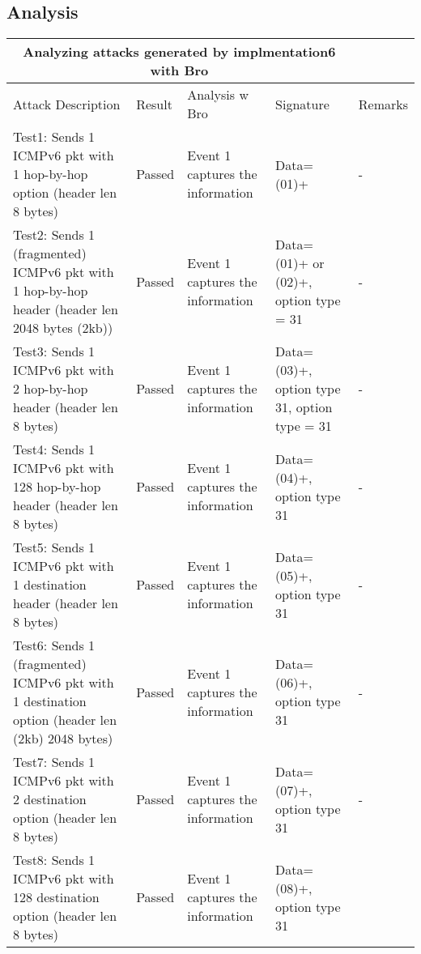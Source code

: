 \documentclass{article}
\begin{document}
\subsection{Analysis} 
\begin{longtable}{|p{1.5in}|p{0.5in}|p{1in}|p{0.8in}|p{1.2in}}
\hline
\multicolumn{4}{|c|}{Analyzing attacks generated by implmentation6 with Bro}\\ \hline
Attack Description&Result&Analysis w Bro&Signature&Remarks\\ \hline

Test1: Sends 1 ICMPv6 pkt with 1 hop-by-hop option (header len 8 bytes) &
Passed &
Event 1 captures the information &
Data=(01)+ &
-
\\ \hline
Test2: Sends 1  (fragmented) ICMPv6 pkt with 1 hop-by-hop header (header len 2048 bytes (2kb)) &
Passed &
Event 1 captures the information &
Data=(01)+ or (02)+, option type = 31 &
-
\\ \hline
Test3: Sends 1 ICMPv6 pkt with 2 hop-by-hop header (header len 8 bytes) &
Passed &
Event 1 captures the information &
Data=(03)+, option type 31, option type = 31 &
-
\\ \hline
Test4: Sends 1 ICMPv6 pkt with 128 hop-by-hop header (header len 8 bytes) &
Passed &
Event 1 captures the information &
Data=(04)+, option type 31 &
-
\\ \hline
Test5: Sends 1 ICMPv6 pkt with 1 destination header (header len 8 bytes) &
Passed &
Event 1 captures the information &
Data=(05)+, option type 31 &
-
\\ \hline
Test6: Sends 1 (fragmented) ICMPv6 pkt with 1 destination option (header len (2kb) 2048 bytes) &
Passed &
Event 1 captures the information &
Data=(06)+, option type 31 &
-
\\ \hline
Test7: Sends 1 ICMPv6 pkt with 2 destination option (header len 8 bytes) &
Passed &
Event 1 captures the information &
Data=(07)+, option type 31 &
-
\\ \hline
Test8: Sends 1 ICMPv6 pkt with 128 destination option (header len 8 bytes) &
Passed &
Event 1 captures the information &
Data=(08)+, option type 31 &

\end{longtable}
\end{document}

